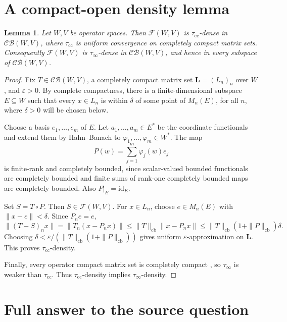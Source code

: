 \documentclass[11pt]{article}
\newtheorem*{lemma}{Lemma}
\newcommand{\CB}{\mathcal{CB}}
\begin{document}
\section*{A compact-open density lemma}

\begin{lemma}
Let \(W,V\) be operator spaces.  Then \(\mathcal F(W,V)\) is
\(\tau_{\mathrm{cc}}\)-dense in \(\CB(W,V)\), where
\(\tau_{\mathrm{cc}}\) is uniform convergence on completely compact matrix
sets.  Consequently \(\mathcal F(W,V)\) is \(\tau_\infty\)-dense in
\(\CB(W,V)\), and hence in every subspace of \(\CB(W,V)\).
\end{lemma}

\begin{proof}
Fix \(T\in\CB(W,V)\), a completely compact matrix set
\(\mathbf L=(L_n)_n\) over \(W\), and \(\varepsilon>0\).  By complete
compactness, there is a finite-dimensional subspace \(E\subseteq W\) such
that every \(x\in L_n\) is within \(\delta\) of some point of \(M_n(E)\), for
all \(n\), where \(\delta>0\) will be chosen below.

Choose a basis \(e_1,\ldots,e_m\) of \(E\).  Let \(a_1,\ldots,a_m\in E^*\)
be the coordinate functionals and extend them by Hahn--Banach to
\(\varphi_1,\ldots,\varphi_m\in W^*\).  The map
\[
  P(w)=\sum_{j=1}^m \varphi_j(w)e_j
\]
is finite-rank and completely bounded, since scalar-valued bounded
functionals are completely bounded and finite sums of rank-one completely
bounded maps are completely bounded.  Also \(P|_E=\mathrm{id}_E\).

Set \(S=T\circ P\).  Then \(S\in\mathcal F(W,V)\).  For \(x\in L_n\), choose
\(e\in M_n(E)\) with \(\|x-e\|<\delta\).  Since \(P_n e=e\),
\[
 \|(T-S)_n x\|
 = \|T_n(x-P_nx)\|
 \le \|T\|_{\mathrm{cb}}\|x-P_nx\|
 \le \|T\|_{\mathrm{cb}}(1+\|P\|_{\mathrm{cb}})\delta .
\]
Choosing \(\delta<\varepsilon/(\|T\|_{\mathrm{cb}}(1+\|P\|_{\mathrm{cb}}))\)
gives uniform \(\varepsilon\)-approximation on \(\mathbf L\).  This proves
\(\tau_{\mathrm{cc}}\)-density.

Finally, every operator compact matrix set is completely compact
\cite{CDG2024}, so \(\tau_\infty\) is weaker than \(\tau_{\mathrm{cc}}\).
Thus \(\tau_{\mathrm{cc}}\)-density implies \(\tau_\infty\)-density.
\end{proof}

\section*{Full answer to the source question}
\end{document}
